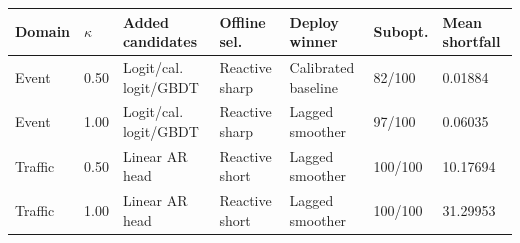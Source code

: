 \begin{tabular}{lllllll}
\toprule
Domain & \(\kappa\) & Added candidates & Offline sel. & Deploy winner & Subopt. & Mean shortfall \\
\midrule
Event & 0.50 & Logit/cal. logit/GBDT & Reactive sharp & Calibrated baseline & 82/100 & 0.01884 \\
Event & 1.00 & Logit/cal. logit/GBDT & Reactive sharp & Lagged smoother & 97/100 & 0.06035 \\
Traffic & 0.50 & Linear AR head & Reactive short & Lagged smoother & 100/100 & 10.17694 \\
Traffic & 1.00 & Linear AR head & Reactive short & Lagged smoother & 100/100 & 31.29953 \\
\bottomrule
\end{tabular}
